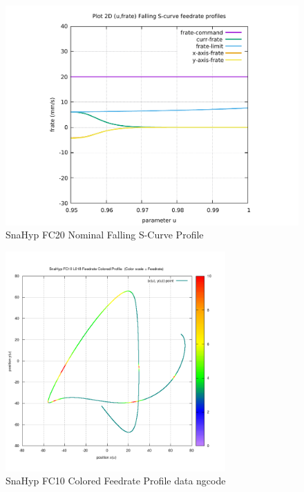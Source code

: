 \begin{figure}
	\caption     {SnaHyp FC20 Nominal Falling S-Curve Profile}
	\label{16-img-SnaHyp-FC20-Nominal-Falling-S-Curve-Profile.pdf}
\includegraphics[width=1.00\textwidth]{Chap4/appendix/app-SnaHyp/plots/16-img-SnaHyp-FC20-Nominal-Falling-S-Curve-Profile.pdf}
\end{figure}

\clearpage
\pagebreak

\begin{figure}
	\caption     {SnaHyp FC10 Colored Feedrate Profile data ngcode}
	\label{17-img-SnaHyp-FC10-Colored-Feedrate-Profile-data_ngcode.png}
\includegraphics[width=0.75\textwidth]{Chap4/appendix/app-SnaHyp/plots/17-img-SnaHyp-FC10-Colored-Feedrate-Profile-data_ngcode.png}
\end{figure}


